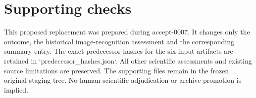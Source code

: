 \documentclass[10pt]{article}
\begin{document}
\section*{Supporting checks}
This proposed replacement was prepared during accept-0007. It changes only the outcome, the historical image-recognition assessment and the corresponding summary entry. The exact predecessor hashes for the six input artifacts are retained in `predecessor\_hashes.json`. All other scientific assessments and existing source limitations are preserved. The supporting files remain in the frozen original staging tree. No human scientific adjudication or archive promotion is implied.\par
\end{document}
